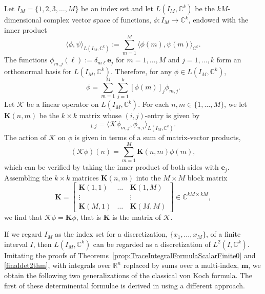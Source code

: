 \documentclass{birkjour}
\theoremstyle{definition}
\theoremstyle{remark}
\numberwithin{equation}{section}
\begin{document}
Let $I_M = \{1, 2, 3, \dots, M\}$ be an index set 
and let $L(I_M, \mathbb{C}^k)$ be the $kM$-dimensional complex vector space of functions,
 $ \phi : I_M \rightarrow \mathbb{C}^k$,
 endowed with the inner product
 \begin{equation}
    \langle \phi, \psi \rangle_{L(I_M, \mathbb{C}^k)} := \sum_{m=1}^M \langle \phi(m), \psi(m) \rangle_{\mathbb{C}^k}.
\end{equation}
The functions $\phi_{m, j} (\ell) := \delta_{m \ell} \mathbf{e}_j$
for $m=1,\dots,M$ and $j=1,\dots,k$ form an orthonormal basis for $L(I_M, \mathbb{C}^k)$.
Therefore, for any $\phi \in L(I_M, \mathbb{C}^k)$, 
\begin{equation}\label{disc6}
    \phi = \sum_{m=1}^M\sum_{j=1}^k [\phi(m)]_j \phi_{m, j}.
\end{equation}
Let $\mathcal{K}$ be a linear operator on $L(I_M, \mathbb{C}^k)$. 
For each $n,m\in\{1,\dots,M\}$, we let $\mathbf K(n,m)$ be the 
$k\times k$ matrix whose $(i,j)$-entry is given by
 \begin{equation}
 [\mathbf K(n,m)]_{i,j} = \langle \mathcal K \phi_{m,j}, \phi_{n,i}\rangle_{L(I_M,\mathbb C^k)}.
\end{equation}
The action of  $\mathcal{K}$ on $\phi$ is given in terms of a sum of matrix-vector products,
\begin{equation}\label{claimkphi}
    (\mathcal{K} \phi)(n) = \sum_{m=1}^M \mathbf{K}(n,m) \phi(m),
\end{equation}
which can be verified by taking the inner product of both sides with $\mathbf e_j$.
Assembling  the $k\times k$ matrices $\mathbf K(n,m)$ into the $M\times M$ block matrix
\begin{equation}\label{kblocks}
    \mathbf{K} = \begin{bmatrix}
    \mathbf{K}(1,1) & \dots & \mathbf{K}(1,M)\\
    \vdots & \quad & \vdots\\
    \mathbf{K}(M,1) & \dots & \mathbf{K}(M,M)
    \end{bmatrix} \in \mathbb{C}^{kM \times kM},
\end{equation}
we find that $\mathcal K \phi = \mathbf K \phi$, that is $\mathbf K$ is the matrix of $\mathcal K$. 

 If we regard $I_M$ as the index set for a discretization, $\{x_1, \dots, x_M\}$, of a finite interval $I$, then $L(I_M, \mathbb{C}^k)$  can be regarded as a discretization of
  $L^2(I, \mathbb{C}^k)$. 
 Imitating the  proofs of Theorems~\ref{prop:TraceIntegralFormulaScalarFinite0} and \ref{finaldet2thm}, with integrals over $\mathbb R^n$ replaced by sums over a multi-index,
 $\mathbf m$, we obtain the following two generalizations of the classical von Koch formula.
 The first of these determinental formulae is derived in \cite[(8.3)]{Bornemann} using a different approach.  
   
\end{document}
